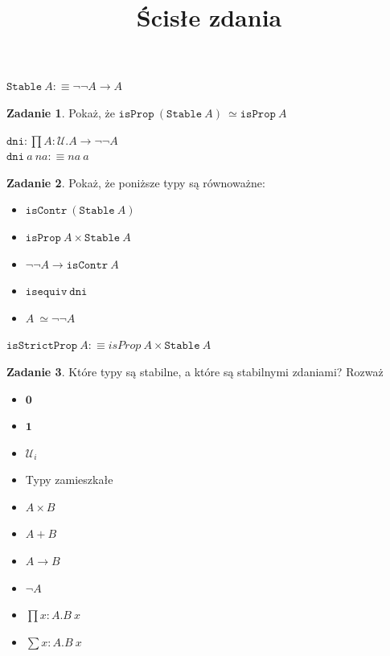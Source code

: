 \documentclass[11pt]{article}
\title{Ścisłe zdania}
\theoremstyle{definition}
\newtheorem{exercise}{Zadanie}[section]
\newcommand{\txt}[1]{\texttt{#1}}
\newcommand{\text}[1]{\texttt{#1}}
\renewcommand{\(}{\left(}
\renewcommand{\)}{\right)}
\newcommand{\defn}{:\equiv}
\newcommand{\U}{\mathcal{U}}
\newcommand{\isContr}{\text{isContr}}
\newcommand{\isProp}{\text{isProp}}
\newcommand{\apl}[2]{#1\ #2}
\newcommand{\hequiv}[2]{#1 \simeq #2}
\newcommand{\isequiv}{\text{isequiv}}
\newcommand{\Empty}{\mathbf{0}}
\newcommand{\Unit}{\mathbf{1}}
\newcommand{\dprod}[2]{\prod #1.#2}
\newcommand{\dsum}[2]{\sum #1.#2}
\newcommand{\prodt}[2]{#1 \times #2}
\newcommand{\sumt}[2]{#1 + #2}
\begin{document}
\maketitle

\newcommand{\Stable}{\txt{Stable}}

\newcommand{\Decidable}{\txt{Decidable}}

\begin{center}
$\apl{\Stable}{A} \defn \neg\neg A \to A$ \\
\end{center}

\begin{exercise}
  Pokaż, że $\apl{\isProp}{(\apl{\Stable}{A})} \hequiv\ \apl{\isProp}{A}$
\end{exercise}

\newcommand{\dni}{\txt{dni}}

\begin{center}
$\dni : \dprod{A : \U}{A \to \neg \neg A}$ \\
$\apl{\apl{\dni}{a}}{na} \defn \apl{na}{a}$
\end{center}

\begin{exercise}
  Pokaż, że poniższe typy są równoważne:
  \begin{itemize}
    \item $\apl{\isContr}{(\apl{\Stable}{A})}$
    \item $\prodt{\apl{\isProp}{A}}{\apl{\Stable}{A}}$
    \item $\neg\neg A \to \apl{\isContr}{A}$
    \item $\apl{\isequiv}{\dni}$
    \item $A \hequiv\ \neg \neg A$
  \end{itemize}
\end{exercise}

\newcommand{\isStrictProp}{\txt{isStrictProp}}

\begin{center}
  $\apl{\isStrictProp}{A} \defn \prodt{\apl{isProp}{A}}{\apl{\Stable}{A}}$
\end{center}

\begin{exercise}
Które typy są stabilne, a które są stabilnymi zdaniami? Rozważ
\begin{itemize}
  \item $\Empty$
  \item $\Unit$
  \item $\U_i$
  \item Typy zamieszkałe
  \item $\prodt{A}{B}$
  \item $\sumt{A}{B}$
  \item $A \to B$
  \item $\neg{A}$
  \item $\dprod{x : A}{\apl{B}{x}}$
  \item $\dsum{x : A}{\apl{B}{x}}$
\end{itemize}

\end{exercise}
\end{document}
